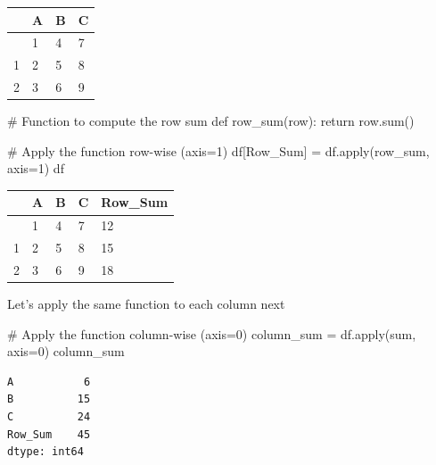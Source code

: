 \documentclass[
  letterpaper,
  DIV=11,
  numbers=noendperiod]{scrreprt}
\newenvironment{Shaded}{\begin{snugshade}}{\end{snugshade}}
\newcommand{\BuiltInTok}[1]{\textcolor[rgb]{0.00,0.23,0.31}{#1}}
\newcommand{\CommentTok}[1]{\textcolor[rgb]{0.37,0.37,0.37}{#1}}
\newcommand{\ControlFlowTok}[1]{\textcolor[rgb]{0.00,0.23,0.31}{#1}}
\newcommand{\DecValTok}[1]{\textcolor[rgb]{0.68,0.00,0.00}{#1}}
\newcommand{\KeywordTok}[1]{\textcolor[rgb]{0.00,0.23,0.31}{#1}}
\newcommand{\NormalTok}[1]{\textcolor[rgb]{0.00,0.23,0.31}{#1}}
\newcommand{\OperatorTok}[1]{\textcolor[rgb]{0.37,0.37,0.37}{#1}}
\newcommand{\StringTok}[1]{\textcolor[rgb]{0.13,0.47,0.30}{#1}}
\begin{document}
\begin{longtable}[]{@{}llll@{}}
\toprule\noalign{}
& A & B & C \\
\midrule\noalign{}
\endhead
\bottomrule\noalign{}
\endlastfoot
0 & 1 & 4 & 7 \\
1 & 2 & 5 & 8 \\
2 & 3 & 6 & 9 \\
\end{longtable}

\begin{Shaded}
\begin{Highlighting}[]
\CommentTok{\# Function to compute the row sum}
\KeywordTok{def}\NormalTok{ row\_sum(row):}
    \ControlFlowTok{return}\NormalTok{ row.}\BuiltInTok{sum}\NormalTok{()}
\end{Highlighting}
\end{Shaded}

\begin{Shaded}
\begin{Highlighting}[]
\CommentTok{\# Apply the function row{-}wise (axis=1)}
\NormalTok{df[}\StringTok{\textquotesingle{}Row\_Sum\textquotesingle{}}\NormalTok{] }\OperatorTok{=}\NormalTok{ df.}\BuiltInTok{apply}\NormalTok{(row\_sum, axis}\OperatorTok{=}\DecValTok{1}\NormalTok{)}
\NormalTok{df}
\end{Highlighting}
\end{Shaded}

\begin{longtable}[]{@{}lllll@{}}
\toprule\noalign{}
& A & B & C & Row\_Sum \\
\midrule\noalign{}
\endhead
\bottomrule\noalign{}
\endlastfoot
0 & 1 & 4 & 7 & 12 \\
1 & 2 & 5 & 8 & 15 \\
2 & 3 & 6 & 9 & 18 \\
\end{longtable}

Let's apply the same function to each column next

\begin{Shaded}
\begin{Highlighting}[]
\CommentTok{\# Apply the function column{-}wise (axis=0)}
\NormalTok{column\_sum }\OperatorTok{=}\NormalTok{ df.}\BuiltInTok{apply}\NormalTok{(}\BuiltInTok{sum}\NormalTok{, axis}\OperatorTok{=}\DecValTok{0}\NormalTok{)}
\NormalTok{column\_sum}
\end{Highlighting}
\end{Shaded}

\begin{verbatim}
A           6
B          15
C          24
Row_Sum    45
dtype: int64
\end{verbatim}
\end{document}
